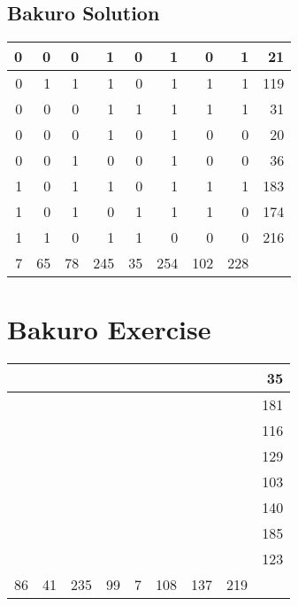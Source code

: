\documentclass[]{article}
\begin{document}
 \subsection{Bakuro Solution} 
\begin{tabular}{rrrrrrrrr}
\hline
 0 &  0 &  0 &   1 &  0 &   1 &   0 &   1 &  21 \\ \hline
 0 &  1 &  1 &   1 &  0 &   1 &   1 &   1 & 119 \\ \hline
 0 &  0 &  0 &   1 &  1 &   1 &   1 &   1 &  31 \\ \hline
 0 &  0 &  0 &   1 &  0 &   1 &   0 &   0 &  20 \\ \hline
 0 &  0 &  1 &   0 &  0 &   1 &   0 &   0 &  36 \\ \hline
 1 &  0 &  1 &   1 &  0 &   1 &   1 &   1 & 183 \\ \hline
 1 &  0 &  1 &   0 &  1 &   1 &   1 &   0 & 174 \\ \hline
 1 &  1 &  0 &   1 &  1 &   0 &   0 &   0 & 216 \\ \hline
 7 & 65 & 78 & 245 & 35 & 254 & 102 & 228 &     \\ \hline
\hline
\end{tabular}\newpage\section{Bakuro Exercise}\begin{tabular}{rrrrrrrrr}
\hline
    &    &     &    &   &     &     &     &  35 \\ \hline
    &    &     &    &   &     &     &     & 181 \\ \hline
    &    &     &    &   &     &     &     & 116 \\ \hline
    &    &     &    &   &     &     &     & 129 \\ \hline
    &    &     &    &   &     &     &     & 103 \\ \hline
    &    &     &    &   &     &     &     & 140 \\ \hline
    &    &     &    &   &     &     &     & 185 \\ \hline
    &    &     &    &   &     &     &     & 123 \\ \hline
 86 & 41 & 235 & 99 & 7 & 108 & 137 & 219 &     \\ \hline
\hline
\end{tabular}\newpage 
\end{document}
